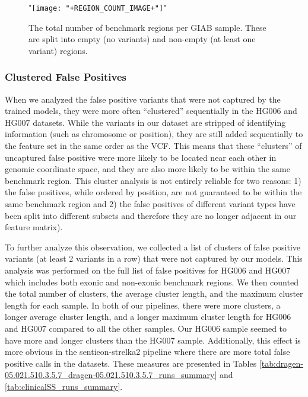 \begin{figure}
    \centering
    {{ "\texttt{[image: "+REGION\_COUNT\_IMAGE+"]}" }} 
    \caption{The total number of benchmark regions per GIAB sample.  These are split into empty (no variants) and non-empty (at least one variant) regions.}
    \label{fig:region_count}
\end{figure}

\subsubsection{Clustered False Positives}
When we analyzed the false positive variants that were not captured by the trained models, they were more often ``clustered'' sequentially in the HG006 and HG007 datasets.
While the variants in our dataset are stripped of identifying information (such as chromosome or position), they are still added sequentially to the feature set in the same order as the VCF.
This means that these ``clusters'' of uncaptured false positive were more likely to be located near each other in genomic coordinate space, and they are also more likely to be within the same benchmark region.
This cluster analysis is not entirely reliable for two reasons: 
1) the false positives, while ordered by position, are not guaranteed to be within the same benchmark region and 
2) the false positives of different variant types have been split into different subsets and therefore they are no longer adjacent in our feature matrix).

To further analyze this observation, we collected a list of clusters of false positive variants (at least 2 variants in a row) that were not captured by our models.
This analysis was performed on the full list of false positives for HG006 and HG007 which includes both exonic and non-exonic benchmark regions.
We then counted the total number of clusters, the average cluster length, and the maximum cluster length for each sample.
In both of our pipelines, there were more clusters, a longer average cluster length, and a longer maximum cluster length for HG006 and HG007 compared to all the other samples.
Our HG006 sample seemed to have more and longer clusters than the HG007 sample.
Additionally, this effect is more obvious in the sentieon-strelka2 pipeline where there are more total false positive calls in the datasets.
These measures are presented in Tables \ref{tab:dragen-05.021.510.3.5.7_dragen-05.021.510.3.5.7_runs_summary} and \ref{tab:clinicalSS_runs_summary}.

